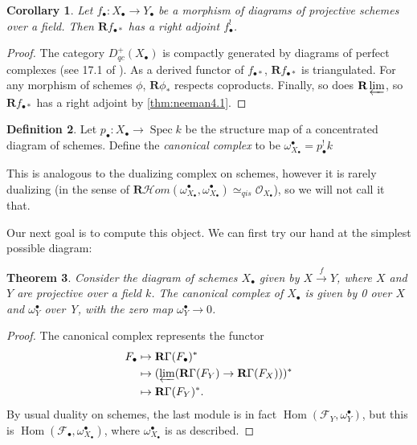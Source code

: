 \documentclass{report}
\newtheorem{theorem}{Theorem}[section]
\newtheorem{cor}[theorem]{Corollary}
\theoremstyle{definition}
\newtheorem{definition}[theorem]{Definition}
\DeclareMathOperator{\Hom}{Hom}
\newcommand{\cHom}{\mathcal{H} \textit{om}}
\DeclareMathOperator{\Spec}{Spec}
\newcommand{\FF}{\mathscr{F}}
\newcommand{\OO}{\mathcal{O}}
\newcommand{\qis}{\simeq_{qis}}
\newcommand{\bR}{\textbf{R}}
\begin{document}
\begin{cor}
	Let $f_\bullet : X_\bullet \rightarrow Y_\bullet$ be a morphism of diagrams of projective schemes over a field.
	Then $\bR f_{\bullet *}$ has a right adjoint $f^!_\bullet$.
\end{cor}
\begin{proof}
	The category $D_{qc}^+(X_\bullet)$ is compactly generated by diagrams of perfect complexes (see 17.1 of \cite{Lipman2009}).
	As a derived functor of $f_{\bullet *}$, $\bR f_{\bullet *}$ is triangulated.
	For any morphism of schemes $\phi$, $\bR \phi_*$ respects coproducts.
	Finally, so does $\bR \varprojlim$, so $\bR f_{\bullet *}$ has a right adjoint by \ref{thm:neeman4.1}.
\end{proof}

\begin{definition}
	Let $p_\bullet : X_\bullet \rightarrow \Spec k$ be the structure map of a concentrated diagram of schemes.
	Define the \textit{canonical complex} to be $\omega_{X_\bullet}^\bullet = p_\bullet^! k$
\end{definition}

This is analogous to the dualizing complex on schemes, however it is rarely dualizing (in the sense of $\bR \cHom(\omega_{X_\bullet}^\bullet, \omega_{X_\bullet}^\bullet) \qis \OO_{X_\bullet}$), so we will not call it that.

Our next goal is to compute this object.
We can first try our hand at the simplest possible diagram:
\begin{theorem}
	Consider the diagram of schemes $X_\bullet$ given by $X \xrightarrow{f} Y$, where $X$ and $Y$ are projective over a field $k$.
	The canonical complex of $X_\bullet$ is given by 0 over $X$ and $\omega^\bullet_Y$ over Y, with the zero map $\omega^\bullet_Y \rightarrow 0$.
\end{theorem}
\begin{proof}
	The canonical complex represents the functor
	\begin{align*}
	F_\bullet &\mapsto \bR \Gamma (F_\bullet)^* \\
	&\mapsto (\varprojlim (\bR \Gamma (F_Y) \rightarrow \bR \Gamma (F_X)))^* \\
	&\mapsto \bR \Gamma (F_Y)^*.
	\end{align*}
	By usual duality on schemes, the last module is in fact $\Hom(\FF_Y, \omega_Y^\bullet)$, but this is $\Hom(\FF_\bullet, \omega^\bullet_{X_\bullet})$, where $\omega^\bullet_{X_\bullet}$ is as described.
\end{proof}
\end{document}
